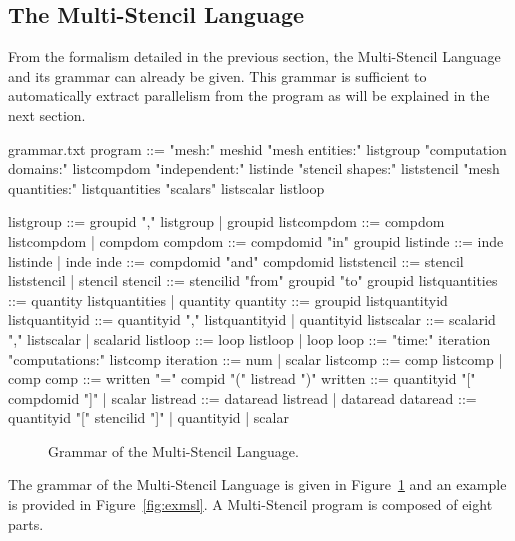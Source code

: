 \subsection{The Multi-Stencil Language}

From the formalism detailed in the previous section, the Multi-Stencil Language and its grammar can already be given.
This grammar is sufficient to automatically extract parallelism from the program as will be explained in the next section.

\begin{filecontents*}{grammar.txt}
program ::= "mesh:" meshid 
            "mesh entities:" listgroup
            "computation domains:" listcompdom
            "independent:" listinde
            "stencil shapes:" liststencil
            "mesh quantities:" listquantities
            "scalars" listscalar
            listloop

listgroup ::= groupid "," listgroup | groupid
listcompdom ::= compdom listcompdom | compdom
compdom ::= compdomid "in" groupid
listinde ::= inde listinde | inde
inde ::= compdomid "and" compdomid
liststencil ::= stencil liststencil | stencil
stencil ::= stencilid "from" groupid "to" groupid
listquantities ::= quantity listquantities |  quantity
quantity ::= groupid listquantityid
listquantityid ::= quantityid "," listquantityid |  quantityid
listscalar ::= scalarid "," listscalar | scalarid
listloop ::= loop listloop | loop
loop ::=  "time:" iteration
          "computations:" listcomp
iteration ::= num | scalar
listcomp ::= comp listcomp |  comp
comp ::= written "=" compid "(" listread ")"
written ::= quantityid "[" compdomid "]" | scalar
listread ::= dataread listread | dataread
dataread ::= quantityid "[" stencilid "]" |  quantityid | scalar
\end{filecontents*}

\begin{figure}[hbt]
  \hspace{5mm}
  \begin{minipage}[!h]{0.98\textwidth}
    {}   
    \caption{Grammar of the Multi-Stencil Language. \label{fig:grammar}}
  \end{minipage}
\end{figure}

The grammar of the Multi-Stencil Language is given in Figure~\ref{fig:grammar} and an example is provided in Figure~\ref{fig:exmsl}.
A Multi-Stencil program is composed of eight parts.


